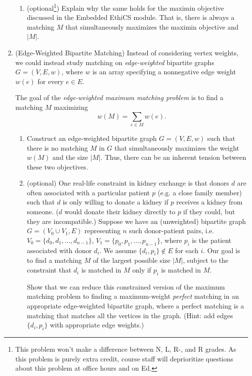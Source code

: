\documentclass[11pt]{article}
\begin{document}
\begin{enumerate}
\begin{enumerate}
        \item (optional\footnote{This problem won't make a difference between N, L, R-, and R grades. As this problem is purely extra credit, course staff will deprioritize questions about this problem at office hours and on Ed.}) Explain why the same holds for the maximin objective discussed in the Embedded EthiCS module.  That is, there is always a matching $M$ that simultaneously maximizes the maximin objective and $|M|$. 
        \end{enumerate}
        

\item (Edge-Weighted Bipartite Matching) 
  Instead of considering vertex weights, we could instead study matching on
{\em edge-weighted} bipartite graphs $G = (V,E,w)$, where $w$ is an array specifying a nonnegative edge weight $w(e)$ for every $e\in E$.  

   The goal of the {\em edge-weighted maximum matching problem} is to find a matching $M$ maximizing $$w(M) = \sum_{e\in M} w(e).$$
   \begin{enumerate}
    \item Construct an edge-weighted bipartite graph $G = (V,E,w)$ such that there is no matching $M$ in $G$ that simultaneously maximizes the weight $w(M)$ and the size $|M|$.  Thus, there can be an inherent tension between these two objectives. 

    \item (optional\footnotemark[1])
    One real-life constraint in kidney exchange is that donors $d$ are often associated with a particular patient $p$ (e.g. a close family member) such that $d$ is only willing to donate a kidney if $p$ receives a kidney from someone.  ($d$ would donate their kidney directly to $p$ if they could, but they are incompatible.) 
    Suppose we have an (unweighted) bipartite graph $G=(V_0\cup V_1,E)$ representing $n$ such donor-patient pairs, i.e. $V_0=\{d_0,d_1,\ldots,d_{n-1}\}$, $V_1 = \{p_0,p_1,\ldots,p_{n-1}\}$, where $p_i$ is the patient associated with donor $d_i$. We assume $\{d_i,p_i\}\notin E$ for each $i$.   Our goal is to find a matching $M$ of the largest possible size $|M|$, subject to the constraint that $d_i$ is matched in $M$ only if $p_i$ is matched in $M$. 

    Show that we can reduce this constrained version of the maximum matching problem to finding a maximum-weight {\em perfect} matching in an appropriate edge-weighted bipartite graph, where
    a perfect matching is a matching that matches all the vertices in the graph. (Hint: add edges $\{d_i,p_i\}$ with appropriate edge weights.) 
    \end{enumerate}

\end{enumerate}
\end{document}
